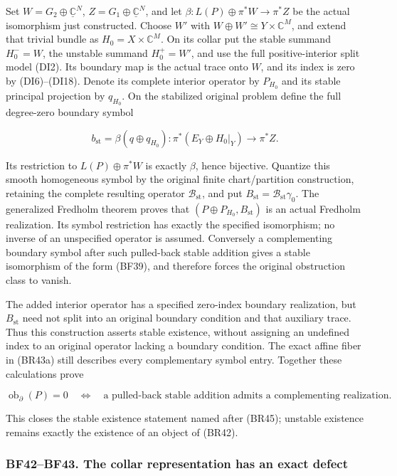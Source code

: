 \documentclass[
  11pt,
]{article}
\begin{document}
Set \(W=G_2\oplus\underline{\mathbb C}^{N}\),
\(Z=G_1\oplus\underline{\mathbb C}^{N}\), and let
\(\beta:L(P)\oplus\pi^*W\to\pi^*Z\) be the actual isomorphism just
constructed. Choose \(W'\) with
\(W\oplus W'\cong Y\times\mathbb C^{M}\), and extend that trivial bundle
as \(H_0=X\times\mathbb C^{M}\). On its collar put the stable summand
\(H_0^-=W\), the unstable summand \(H_0^+=W'\), and use the full
positive-interior split model (DI2). Its boundary map is the actual
trace onto \(W\), and its index is zero by (DI6)--(DI18). Denote its
complete interior operator by \(P_{H_0}\) and its stable principal
projection by \(q_{H_0}\). On the stabilized original problem define the
full degree-zero boundary symbol

\[
 b_{\mathrm{st}}=
    \beta(q\oplus q_{H_0}):
       \pi^*(E_Y\oplus H_0|_Y)\longrightarrow\pi^*Z.
 \tag{BF40}
\]

Its restriction to \(L(P)\oplus\pi^*W\) is exactly \(\beta\), hence
bijective. Quantize this smooth homogeneous symbol by the original
finite chart/partition construction, retaining the complete resulting
operator \(\mathcal B_{\mathrm{st}}\), and put
\(B_{\mathrm{st}}=\mathcal B_{\mathrm{st}}\gamma_0\). The generalized
Fredholm theorem proves that \((P\oplus P_{H_0},B_{\mathrm{st}})\) is an
actual Fredholm realization. Its symbol restriction has exactly the
specified isomorphism; no inverse of an unspecified operator is assumed.
Conversely a complementing boundary symbol after such pulled-back stable
addition gives a stable isomorphism of the form (BF39), and therefore
forces the original obstruction class to vanish.

The added interior operator has a specified zero-index boundary
realization, but \(B_{\mathrm{st}}\) need not split into an original
boundary condition and that auxiliary trace. Thus this construction
asserts stable existence, without assigning an undefined index to an
original operator lacking a boundary condition. The exact affine fiber
in (BR43a) still describes every complementary symbol entry. Together
these calculations prove

\[
 \operatorname{ob}_{\partial}(P)=0
 \quad\Longleftrightarrow\quad
 \text{a pulled-back stable addition admits a complementing realization}.
 \tag{BF41}
\]

This closes the stable existence statement named after (BR45); unstable
existence remains exactly the existence of an object of (BR42).

\subsubsection{BF42--BF43. The collar representation has an exact
defect}\label{bf42bf43.-the-collar-representation-has-an-exact-defect}
\end{document}
